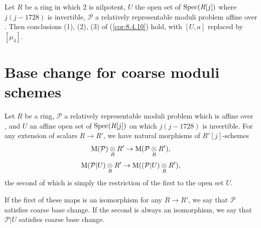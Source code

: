 \begin{kcor}\label{cor:8.4.12}
Let $R$ be a ring in which $2$ is nilpotent, $U$ the open set of $\operatorname{Spec}(R[j])$ where $j(j-1728)$ is invertible, $\mathcal{P}$ a relatively representable moduli problem affine over \EllR. Then conclusions (1), (2), (3) of (\ref{cor:8.4.10}) hold, with $[U, a]$ replaced by $[\mu_4]$.
\end{kcor}

\section{Base change for coarse moduli schemes}
\label{sec:8.5}

\kmitem\label{item:8.5.1}
Let $R$ be a ring, $\mathcal{P}$ a relatively representable moduli problem which is affine over \EllR, and $U$ an affine open set of $\operatorname{Spec}(R[j])$ on which $j(j-1728)$ is invertible. For any extension of scalars $R \to R'$, we have natural morphisms of $R'[j]$-schemes
\begin{equation}\label{eq:8.5.1.1}
\mathrm{M}(\mathcal{P}) \underset{R}{\otimes} R' \to \mathrm{M}(\mathcal{P} \underset{R}{\otimes} R') ,
\end{equation}
\begin{equation}\label{eq:8.5.1.2}
\mathrm{M}(\mathcal{P}|U) \underset{R}{\otimes} R' \to \mathrm{M}((\mathcal{P}|U) \underset{R}{\otimes} R') ,
\end{equation}
the second of which is simply the restriction of the first to the open set $U$.

\kmitem\label{item:8.5.2}
If the first of these maps is an isomorphism for any $R \to R'$, we say that $\mathcal{P}$ satisfies coarse base change. If the second is always an isomorphism, we say that $\mathcal{P}|U$ satisfies coarse base change.

